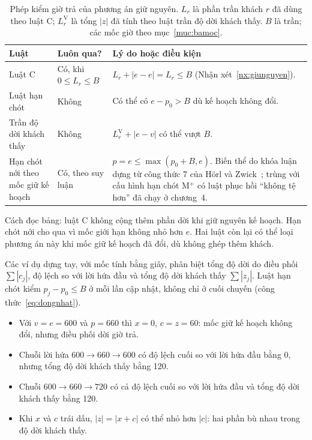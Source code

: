 \begin{table}[htbp]
\centering
\caption[Phép kiểm giờ trả của phương án giữ nguyên kế hoạch]{Phép kiểm giờ trả của phương án giữ nguyên. $L_r$ là phần trần khách $r$ đã dùng theo luật C; $L_r^{\mathrm V}$ là tổng $|z|$ đã tính theo luật trần độ dời khách thấy. $B$ là trần; các mốc giờ theo mục~\ref{muc:bamoc}.}
\label{bang:pl-giunguyen}
\small
\begin{tabular}{@{}>{\raggedright\arraybackslash}p{3.4cm}>{\raggedright\arraybackslash}p{2.7cm}>{\raggedright\arraybackslash}p{8.7cm}@{}}
\toprule
\textbf{Luật} & \textbf{Luôn qua?} & \textbf{Lý do hoặc điều kiện} \\
\midrule
Luật C & Có, khi $0\le L_r\le B$ & $L_r+|e-e|=L_r\le B$ (Nhận xét~\ref{nx:giunguyen}). \\
Luật hạn chót & Không & Có thể có $e-p_0>B$ dù kế hoạch không đổi. \\
Trần độ dời khách thấy & Không & $L_r^{\mathrm V}+|e-v|$ có thể vượt $B$. \\
Hạn chót nới theo mốc giữ kế hoạch & Có, theo suy luận & $p=e\le\max(p_0+B,e)$. Biến thể do khóa luận dựng từ công thức 7 của Hörl và Zwick~\cite{horl2022}; trùng với cấu hình hạn chót M$^{+}$ có luật phục hồi ``không tệ hơn'' đã chạy ở chương~4. \\
\bottomrule
\end{tabular}
\end{table}

Cách đọc bảng: luật C không cộng thêm phần dời khi giữ nguyên kế hoạch. Hạn chót nới cho qua vì mốc giới hạn không nhỏ hơn $e$. Hai luật còn lại có thể loại phương án này khi mốc giữ kế hoạch đã đổi, dù không ghép thêm khách.

Các ví dụ dựng tay, với mốc tính bằng giây, phân biệt tổng độ dời do điều phối $\sum|c_j|$, độ lệch so với lời hứa đầu và tổng độ dời khách thấy $\sum|z_j|$. Luật hạn chót kiểm $p_j-p_0\le B$ ở mỗi lần cập nhật, không chỉ ở cuối chuyến (công thức~\eqref{eq:dongnhat}).
\begin{itemize}[leftmargin=1.2cm,itemsep=0pt,topsep=2pt]
\item Với $v=e=600$ và $p=660$ thì $x=0$, $c=z=60$: mốc giữ kế hoạch không đổi, nhưng điều phối dời giờ trả.
\item Chuỗi lời hứa $600\to660\to600$ có độ lệch cuối so với lời hứa đầu bằng 0, nhưng tổng độ dời khách thấy bằng 120.
\item Chuỗi $600\to660\to720$ có cả độ lệch cuối so với lời hứa đầu và tổng độ dời khách thấy bằng 120.
\item Khi $x$ và $c$ trái dấu, $|z|=|x+c|$ có thể nhỏ hơn $|c|$: hai phần bù nhau trong độ dời khách thấy.
\end{itemize}

